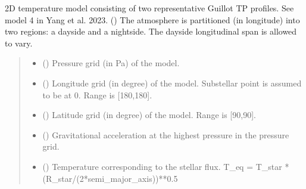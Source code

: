 \documentclass[letterpaper,10pt,english]{sphinxmanual}
\begin{document}
\begin{fulllineitems}
\label{\detokenize{api:nemesispy.Model4}}
\pysigstartsignatures
{}
\pysigstopsignatures
\sphinxAtStartPar
2D temperature model consisting of two representative Guillot TP profiles.
See model 4 in Yang et al. 2023. ()
The atmosphere is partitioned (in longitude) into two regions: a dayside
and a nightside. The dayside longitudinal span is allowed to vary.
\begin{quote}\begin{description}
\begin{itemize}
\item {} 
\sphinxAtStartPar
{} () \textendash{} Pressure grid (in Pa) of the model.

\item {} 
\sphinxAtStartPar
{} () \textendash{} Longitude grid (in degree) of the model.
Substellar point is assumed to be at 0.
Range is {[}\sphinxhyphen{}180,180{]}.

\item {} 
\sphinxAtStartPar
{} () \textendash{} Latitude grid (in degree) of the model.
Range is {[}\sphinxhyphen{}90,90{]}.

\item {} 
\sphinxAtStartPar
{} () \textendash{} Gravitational acceleration at the highest pressure in the pressure
grid.

\item {} 
\sphinxAtStartPar
{} () \textendash{} Temperature corresponding to the stellar flux.
T\_eq = T\_star * (R\_star/(2*semi\_major\_axis))**0.5


\end{itemize}
\end{description}
\end{quote}
\end{fulllineitems}
\end{document}
